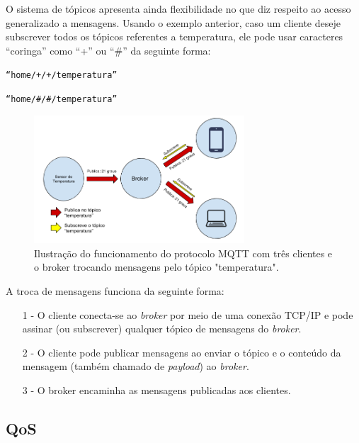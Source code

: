 O sistema de tópicos apresenta ainda flexibilidade no que diz respeito ao acesso generalizado a mensagens. Usando o exemplo anterior, caso um cliente deseje subscrever todos os tópicos referentes a temperatura, ele pode usar caracteres “coringa” como “+” ou “\#” da seguinte forma:

\begin{center}
    \texttt{“home/+/+/temperatura”}
    
    \texttt{“home/\#/\#/temperatura”}
\end{center}

\begin{figure}[ht]
    \begin{center}
    \includegraphics[width=0.7\textwidth]{figuras/mqtt.PNG}
    \end{center}
    \caption[Ilustração do funcionamento do protocolo MQTT.]{Ilustração do funcionamento do protocolo MQTT com três clientes e o broker trocando mensagens pelo tópico "temperatura".}
    \label{mqtt}
\end{figure}

A troca de mensagens funciona da seguinte forma:
\begin{itemize}
    \item[1 -] O cliente conecta-se ao \textit{broker} por meio de uma conexão TCP/IP e pode assinar (ou subscrever) qualquer tópico de mensagens do \textit{broker}.
    \item[2 -] O cliente pode publicar mensagens ao enviar o tópico e o conteúdo da mensagem (também chamado de \textit{payload}) ao \textit{broker}.
    \item[3 -] O broker encaminha as mensagens publicadas aos clientes.
\end{itemize}

\subsection{QoS}

